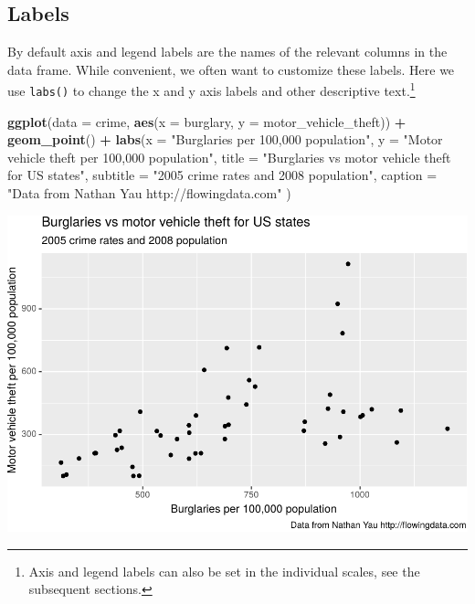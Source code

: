 \documentclass[]{krantz}
\makeatletter
\newenvironment{Shaded}{\begin{snugshade}}{\end{snugshade}}
\newcommand{\DataTypeTok}[1]{\textcolor[rgb]{0.27,0.27,0.27}{#1}}
\newcommand{\KeywordTok}[1]{\textcolor[rgb]{0.27,0.27,0.27}{\textbf{#1}}}
\newcommand{\NormalTok}[1]{#1}
\newcommand{\OperatorTok}[1]{\textcolor[rgb]{0.43,0.43,0.43}{\textbf{#1}}}
\newcommand{\StringTok}[1]{\textcolor[rgb]{0.5,0.5,0.5}{#1}}
\newenvironment{kframe}{%
\medskip{}
\setlength{\fboxsep}{.8em}
 \def\at@end@of@kframe{}%
 \ifinner\ifhmode%
  \def\at@end@of@kframe{\end{minipage}}%
  \begin{minipage}{\columnwidth}%
 \fi\fi%
 \def\FrameCommand##1{\hskip\@totalleftmargin \hskip-\fboxsep
 \colorbox{shadecolor}{##1}\hskip-\fboxsep
     \hskip-\linewidth \hskip-\@totalleftmargin \hskip\columnwidth}%
 \MakeFramed {\advance\hsize-\width
   \@totalleftmargin\z@ \linewidth\hsize
   \@setminipage}}%
 {\par\unskip\endMakeFramed%
 \at@end@of@kframe}
\renewenvironment{Shaded}{\begin{kframe}}{\end{kframe}}
\makeatother
\begin{document}
\hypertarget{labels}{%
\subsection{Labels}\label{labels}}

By default axis and legend labels are the names of the relevant columns in the data frame. While convenient, we often want to customize these labels. Here we use \texttt{labs()} to change the x and y axis labels and other descriptive text.\footnote{Axis and legend labels can also be set in the individual scales, see the subsequent sections.}

\begin{Shaded}
\begin{Highlighting}[]
\KeywordTok{ggplot}\NormalTok{(}\DataTypeTok{data =}\NormalTok{ crime, }\KeywordTok{aes}\NormalTok{(}\DataTypeTok{x =}\NormalTok{ burglary, }\DataTypeTok{y =}\NormalTok{ motor_vehicle_theft)) }\OperatorTok{+}\StringTok{ }
\StringTok{    }\KeywordTok{geom_point}\NormalTok{() }\OperatorTok{+}\StringTok{ }
\StringTok{    }\KeywordTok{labs}\NormalTok{(}\DataTypeTok{x =} \StringTok{"Burglaries per 100,000 population"}\NormalTok{, }
         \DataTypeTok{y =} \StringTok{"Motor vehicle theft per 100,000 population"}\NormalTok{,}
         \DataTypeTok{title =} \StringTok{"Burglaries vs motor vehicle theft for US states"}\NormalTok{,}
         \DataTypeTok{subtitle =} \StringTok{"2005 crime rates and 2008 population"}\NormalTok{,}
         \DataTypeTok{caption =} \StringTok{"Data from Nathan Yau http://flowingdata.com"}
\NormalTok{         )}
\end{Highlighting}
\end{Shaded}

\includegraphics{bookdown_files/figure-latex/unnamed-chunk-68-1.pdf}
\end{document}

